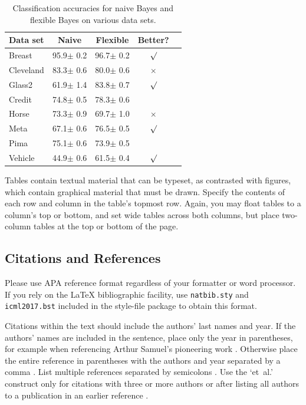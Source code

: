 \documentclass{article}
\begin{document}
\begin{table}[t]
\caption{Classification accuracies for naive Bayes and flexible 
Bayes on various data sets.}
\label{sample-table}
\vskip 0.15in
\begin{center}
\begin{small}
\begin{sc}
\begin{tabular}{lcccr}
\hline
\abovespace\belowspace
Data set & Naive & Flexible & Better? \\
\hline
\abovespace
Breast    & 95.9$\pm$ 0.2& 96.7$\pm$ 0.2& $\surd$ \\
Cleveland & 83.3$\pm$ 0.6& 80.0$\pm$ 0.6& $\times$\\
Glass2    & 61.9$\pm$ 1.4& 83.8$\pm$ 0.7& $\surd$ \\
Credit    & 74.8$\pm$ 0.5& 78.3$\pm$ 0.6&         \\
Horse     & 73.3$\pm$ 0.9& 69.7$\pm$ 1.0& $\times$\\
Meta      & 67.1$\pm$ 0.6& 76.5$\pm$ 0.5& $\surd$ \\
Pima      & 75.1$\pm$ 0.6& 73.9$\pm$ 0.5&         \\
\belowspace
Vehicle   & 44.9$\pm$ 0.6& 61.5$\pm$ 0.4& $\surd$ \\
\hline
\end{tabular}
\end{sc}
\end{small}
\end{center}
\vskip -0.1in
\end{table}

Tables contain textual material that can be typeset, as contrasted 
with figures, which contain graphical material that must be drawn. 
Specify the contents of each row and column in the table's topmost
row. Again, you may float tables to a column's top or bottom, and set
wide tables across both columns, but place two-column tables at the
top or bottom of the page.
 
\subsection{Citations and References} 

Please use APA reference format regardless of your formatter
or word processor. If you rely on the \LaTeX\/ bibliographic 
facility, use {\tt natbib.sty} and {\tt icml2017.bst} 
included in the style-file package to obtain this format.

Citations within the text should include the authors' last names and
year. If the authors' names are included in the sentence, place only
the year in parentheses, for example when referencing Arthur Samuel's
pioneering work . Otherwise place the entire
reference in parentheses with the authors and year separated by a
comma \cite{Samuel59}. List multiple references separated by
semicolons \cite{kearns89,Samuel59,mitchell80}. Use the `et~al.'
construct only for citations with three or more authors or after
listing all authors to a publication in an earlier reference \cite{MachineLearningI}.
\end{document}
